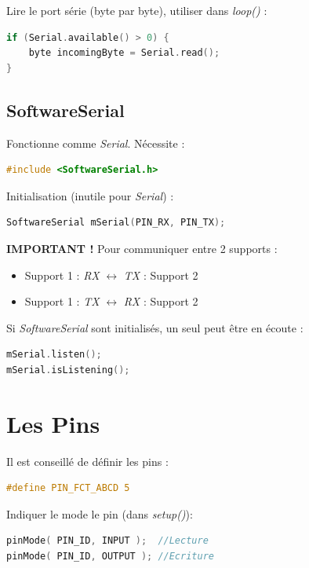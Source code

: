             \bmar
                Lire le port série (byte par byte), utiliser dans \textit{loop()} :
            \emar
            \begin{lstlisting}[language=C]
if (Serial.available() > 0) {
    byte incomingByte = Serial.read();
}
            \end{lstlisting}
        \subsection{SoftwareSerial}
            \bmar
                Fonctionne comme \textit{Serial}. Nécessite :
            \emar
            \begin{lstlisting}[language=C]
#include <SoftwareSerial.h>
            \end{lstlisting}
            \bmar
                Initialisation (inutile pour \textit{Serial}) :
            \emar
            \begin{lstlisting}[language=C]
SoftwareSerial mSerial(PIN_RX, PIN_TX);
            \end{lstlisting}
            \bmar
                \textbf{IMPORTANT !} Pour communiquer entre 2 supports :
            \emar
            \begin{itemize}
                \item Support 1 : \textit{RX} $\leftrightarrow$ \textit{TX} : Support 2
                \item Support 1 : \textit{TX} $\leftrightarrow$ \textit{RX} : Support 2
            \end{itemize}
            \bmar
                Si \textit{SoftwareSerial} sont initialisés, un seul peut être en écoute :
            \emar
            \begin{lstlisting}[language=C]
mSerial.listen();
mSerial.isListening();
            \end{lstlisting}

    \section{Les Pins}
        \bmar
            Il est conseillé de définir les pins :
        \emar
        \begin{lstlisting}[language=C]
#define PIN_FCT_ABCD 5
        \end{lstlisting}

        \bmar
            Indiquer le mode le pin (dans \textit{setup()}):
        \emar

        \begin{lstlisting}[language=C]
pinMode( PIN_ID, INPUT );  //Lecture
pinMode( PIN_ID, OUTPUT ); //Ecriture
        \end{lstlisting}

